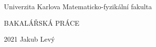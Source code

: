 \documentclass[12pt, a4paper]{article}
\begin{document}
	\begin{center}
		\begin{spacing}{1.25}
			\large
			Univerzita Karlova\linebreak
			Matematicko-fyzikální fakulta
		\end{spacing}
	\end{center}
	\hspace{0pt}
	\vfill
	\begin{center}
		\huge BAKALÁŘSKÁ PRÁCE
	\end{center}
	\vfill
	\large 2021 \hfill Jakub Levý
	\hspace{0pt}
\end{document}
